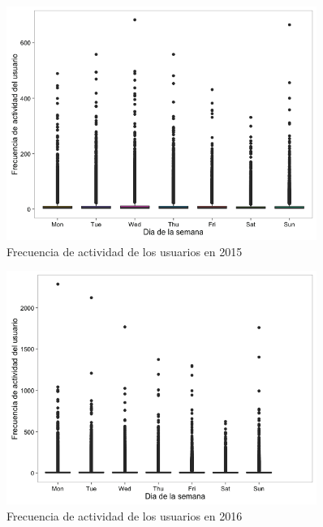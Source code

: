 \begin{figure}[H]
\centering
\includegraphics[width=0.9\textwidth]{../r/frecuenciaactividadusuario_2015}
\caption{Frecuencia de actividad de los usuarios en 2015}
\label{fig:frecuenciaactividadusuario_2015}
\end{figure}

\begin{figure}[H]
\centering
\includegraphics[width=0.9\textwidth]{../r/frecuenciaactividadusuario_2016}
\caption{Frecuencia de actividad de los usuarios en 2016}
\label{fig:frecuenciaactividadusuario_2016}
\end{figure}


